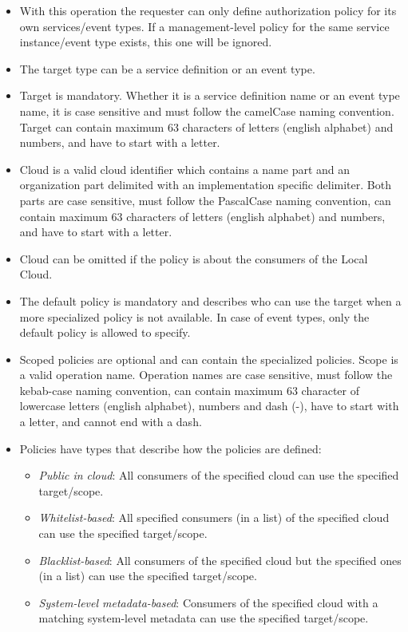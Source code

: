 \documentclass[a4paper]{arrowhead}
\begin{document}
\begin{itemize}
    \item With this operation the requester can only define authorization policy for its own services/event types. If a management-level policy for the same service instance/event type exists, this one will be ignored. 
    \item The target type can be a service definition or an event type. 
    \item Target is mandatory. Whether it is a service definition name or an event type name, it is case sensitive and must follow the camelCase naming convention. Target can contain maximum 63 characters of letters (english alphabet) and numbers, and have to start with a letter.
    \item Cloud is a valid cloud identifier which contains a name part and an organization part delimited with an implementation specific delimiter. Both parts are case sensitive, must follow the PascalCase naming convention, can contain maximum 63 characters of letters (english alphabet) and numbers, and have to start with a letter.
    \item Cloud can be omitted if the policy is about the consumers of the Local Cloud. 
    \item The default policy is mandatory and describes who can use the target when a more specialized policy is not available. In case of event types, only the default policy is allowed to specify.
    \item Scoped policies are optional and can contain the specialized policies. Scope is a valid operation name. Operation names are case sensitive, must follow the kebab-case naming convention, can contain maximum 63 character of lowercase letters (english alphabet), numbers and dash (-), have to start with a letter, and cannot end with a dash.
    \item Policies have types that describe how the policies are defined:
        \begin{itemize}
            \item \textit{Public in cloud}: All consumers of the specified cloud can use the specified target/scope.
            \item \textit{Whitelist-based}: All specified consumers (in a list) of the specified cloud can use the specified target/scope.
            \item \textit{Blacklist-based}: All consumers of the specified cloud but the specified ones (in a list) can use the specified target/scope.
            \item \textit{System-level metadata-based}: Consumers of the specified cloud with a matching system-level metadata can use the specified target/scope.

\end{itemize}
\end{itemize}
\end{document}
